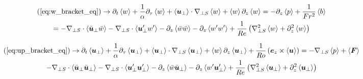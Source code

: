\documentclass{article}
\begin{document}
\begin{multline}
    (\ref{eq:w_bracket_eq}) \to \partial_t \left<w\right>
    +\frac{1}{\alpha}\partial_{\tau}\left<w\right> + 
    \left<\boldsymbol{u}_{\perp}\right>\cdot\nabla_{\perp S}\left<w\right> 
     + \left<w\right>\partial_z\left<w\right> = - \partial_z\left<p\right> +
     \frac{1}{Fr^2}\left<b\right>
     \\
    = -\nabla_{\perp S}\cdot\left<\bar{\boldsymbol{u}}_{\perp} \bar{w}\right> -
    \nabla_{\perp S}\cdot\left<\boldsymbol{u}'_{\perp} w'\right>-\partial_z\left<\bar{w}\bar{w}\right> - \partial_z\left<w'w'\right>
    + \frac{1}{Re}\left(\nabla_{\perp S}^2\left<w\right> + \partial_z^2\left<w\right>\right)
    \label{eq:new_w_bracket_eq}
\end{multline}

\begin{multline}
    (\ref{eq:up_bracket_eq}) \to \partial_t \left<\boldsymbol{u}_{\perp}\right> +
    \frac{1}{\alpha}\partial_{\tau}\left<\boldsymbol{u}_{\perp}\right> + 
    \left<\boldsymbol{u}_{\perp}\right>\cdot\nabla_{\perp S}\left<\boldsymbol{u}_{\perp}\right> 
     + \left<w\right>\partial_z\left<\boldsymbol{u}_{\perp}\right> +
     \frac{1}{Ro}\left(\boldsymbol{e}_z\times\left<\boldsymbol{u}\right>\right) = -\nabla_{\perp S}\left<p\right> +
     \left<\boldsymbol{F}\right>
     \\
     -\nabla_{\perp S}\cdot\left<\bar{\boldsymbol{u}}_{\perp} \bar{\boldsymbol{u}}_{\perp}\right> -
    \nabla_{\perp S}\cdot\left<\boldsymbol{u}'_{\perp} \boldsymbol{u}'_{\perp}\right> -
    \partial_z\left<\bar{w}\bar{\boldsymbol{u}}_{\perp}\right> -
    \partial_z\left<w'\boldsymbol{u}'_{\perp}\right>
    + \frac{1}{Re}\left(\nabla_{\perp S}^2\left<\boldsymbol{u}_{\perp}\right> + \partial_z^2\left<\boldsymbol{u}_{\perp}\right>\right)
    \label{eq:new_up_bracket_eq}
\end{multline}
\end{document}
